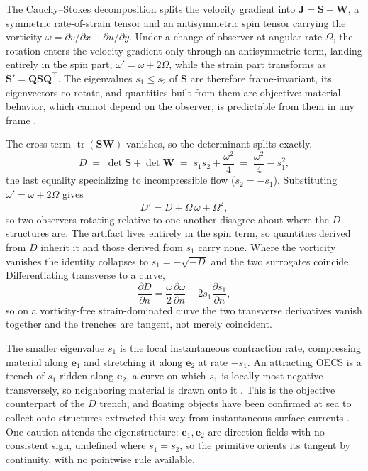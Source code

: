 \documentclass[lettersize,journal]{IEEEtran}
\begin{document}
The Cauchy--Stokes decomposition splits the velocity gradient into
$\mathbf{J} = \mathbf{S} + \mathbf{W}$, a symmetric rate-of-strain
tensor and an antisymmetric spin tensor carrying the vorticity $\omega
= \partial v/\partial x - \partial u/\partial y$. Under a change of
observer at angular rate $\Omega$, the rotation enters the
velocity gradient only through an antisymmetric term, landing
entirely in the spin part, $\omega' = \omega + 2\Omega$, while the
strain part transforms as $\mathbf{S}' = \mathbf{Q}\mathbf{S}
\mathbf{Q}^\top$. The eigenvalues $s_1 \leq s_2$ of $\mathbf{S}$ are
therefore frame-invariant, its eigenvectors co-rotate, and quantities
built from them are objective: material behavior, which cannot depend
on the observer, is predictable from them in any frame \cite{16,17}.

The cross term $\operatorname{tr}(\mathbf{S}\mathbf{W})$ vanishes, so
the determinant splits exactly,
\begin{equation}
    D \;=\; \det\mathbf{S} + \det\mathbf{W}
      \;=\; s_1 s_2 + \frac{\omega^2}{4}
      \;=\; \frac{\omega^2}{4} - s_1^2,
    \label{eq:splitting}
\end{equation}
the last equality specializing to incompressible flow ($s_2 = -s_1$).
Substituting $\omega' = \omega + 2\Omega$ gives
\begin{equation}
    D' = D + \Omega\,\omega + \Omega^2 ,
    \label{eq:D_not_objective}
\end{equation}
so two observers rotating relative to one another disagree about where
the $D$ structures are. The artifact lives entirely in the spin term,
so quantities derived from $D$ inherit it and those
derived from $s_1$ carry none. Where the vorticity vanishes the
identity collapses to $s_1 = -\sqrt{-D}$ and the two surrogates
coincide. Differentiating transverse to a curve,
\begin{equation}
    \frac{\partial D}{\partial n} =
    \frac{\omega}{2}\frac{\partial \omega}{\partial n}
    - 2 s_1 \frac{\partial s_1}{\partial n},
    \label{eq:trench_coincide}
\end{equation}
so on a vorticity-free strain-dominated curve the two transverse
derivatives vanish together and the trenches are tangent, not merely
coincident.

The smaller eigenvalue $s_1$ is the local instantaneous contraction
rate, compressing material along $\mathbf{e}_1$ and stretching it along
$\mathbf{e}_2$ at rate $-s_1$. An attracting OECS is a trench of $s_1$
ridden along $\mathbf{e}_2$, a curve on which $s_1$ is locally most
negative transversely, so neighboring material is drawn onto it
\cite{17}. This is the objective counterpart of the $D$ trench, and
floating objects have been confirmed at sea to collect onto structures
extracted this way from instantaneous surface currents \cite{12}. One
caution attends the eigenstructure: $\mathbf{e}_1,
\mathbf{e}_2$ are direction fields with no consistent sign, undefined
where $s_1 = s_2$, so the primitive orients its tangent by continuity,
with no pointwise rule available.
\end{document}

